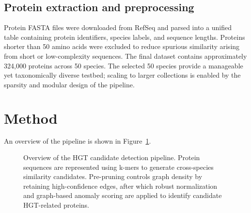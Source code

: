 \documentclass[11pt]{article}
\begin{document}
\subsection{Protein extraction and preprocessing}
Protein FASTA files were downloaded from RefSeq and parsed into a unified table containing protein identifiers, species labels, and sequence lengths. Proteins shorter than 50 amino acids were excluded to reduce spurious similarity arising from short or low-complexity sequences. The final dataset contains approximately 324{,}000 proteins across 50 species. The selected 50 species provide a manageable yet taxonomically diverse testbed; scaling to larger collections is enabled by the sparsity and modular design of the pipeline.

\section{Method}

An overview of the pipeline is shown in Figure~\ref{fig:pipeline_overview}.

\begin{figure}[p]
\centering
{}
\caption{Overview of the HGT candidate detection pipeline. Protein sequences are represented using k-mers to
generate cross-species similarity candidates. Pre-pruning controls graph density by retaining high-confidence
edges, after which robust normalization and graph-based anomaly scoring are applied to identify candidate
HGT-related proteins.}
\label{fig:pipeline_overview}
\end{figure}
\end{document}
